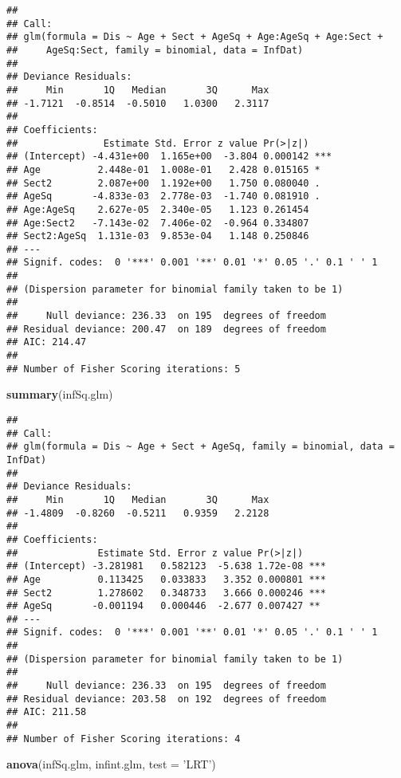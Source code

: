 \documentclass[]{article}
\newenvironment{Shaded}{\begin{snugshade}}{\end{snugshade}}
\newcommand{\KeywordTok}[1]{\textcolor[rgb]{0.13,0.29,0.53}{\textbf{#1}}}
\newcommand{\DataTypeTok}[1]{\textcolor[rgb]{0.13,0.29,0.53}{#1}}
\newcommand{\StringTok}[1]{\textcolor[rgb]{0.31,0.60,0.02}{#1}}
\newcommand{\NormalTok}[1]{#1}
\begin{document}
\begin{verbatim}
## 
## Call:
## glm(formula = Dis ~ Age + Sect + AgeSq + Age:AgeSq + Age:Sect + 
##     AgeSq:Sect, family = binomial, data = InfDat)
## 
## Deviance Residuals: 
##     Min       1Q   Median       3Q      Max  
## -1.7121  -0.8514  -0.5010   1.0300   2.3117  
## 
## Coefficients:
##               Estimate Std. Error z value Pr(>|z|)    
## (Intercept) -4.431e+00  1.165e+00  -3.804 0.000142 ***
## Age          2.448e-01  1.008e-01   2.428 0.015165 *  
## Sect2        2.087e+00  1.192e+00   1.750 0.080040 .  
## AgeSq       -4.833e-03  2.778e-03  -1.740 0.081910 .  
## Age:AgeSq    2.627e-05  2.340e-05   1.123 0.261454    
## Age:Sect2   -7.143e-02  7.406e-02  -0.964 0.334807    
## Sect2:AgeSq  1.131e-03  9.853e-04   1.148 0.250846    
## ---
## Signif. codes:  0 '***' 0.001 '**' 0.01 '*' 0.05 '.' 0.1 ' ' 1
## 
## (Dispersion parameter for binomial family taken to be 1)
## 
##     Null deviance: 236.33  on 195  degrees of freedom
## Residual deviance: 200.47  on 189  degrees of freedom
## AIC: 214.47
## 
## Number of Fisher Scoring iterations: 5
\end{verbatim}

\begin{Shaded}
\begin{Highlighting}[]
\KeywordTok{summary}\NormalTok{(infSq.glm)}
\end{Highlighting}
\end{Shaded}

\begin{verbatim}
## 
## Call:
## glm(formula = Dis ~ Age + Sect + AgeSq, family = binomial, data = InfDat)
## 
## Deviance Residuals: 
##     Min       1Q   Median       3Q      Max  
## -1.4809  -0.8260  -0.5211   0.9359   2.2128  
## 
## Coefficients:
##              Estimate Std. Error z value Pr(>|z|)    
## (Intercept) -3.281981   0.582123  -5.638 1.72e-08 ***
## Age          0.113425   0.033833   3.352 0.000801 ***
## Sect2        1.278602   0.348733   3.666 0.000246 ***
## AgeSq       -0.001194   0.000446  -2.677 0.007427 ** 
## ---
## Signif. codes:  0 '***' 0.001 '**' 0.01 '*' 0.05 '.' 0.1 ' ' 1
## 
## (Dispersion parameter for binomial family taken to be 1)
## 
##     Null deviance: 236.33  on 195  degrees of freedom
## Residual deviance: 203.58  on 192  degrees of freedom
## AIC: 211.58
## 
## Number of Fisher Scoring iterations: 4
\end{verbatim}

\begin{Shaded}
\begin{Highlighting}[]
\KeywordTok{anova}\NormalTok{(infSq.glm, infint.glm, }\DataTypeTok{test =} \StringTok{'LRT'}\NormalTok{)}
\end{Highlighting}
\end{Shaded}
\end{document}

